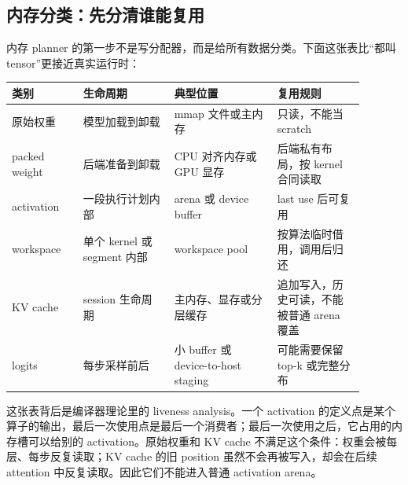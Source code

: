 \subsection{内存分类：先分清谁能复用}

内存 planner 的第一步不是写分配器，而是给所有数据分类。下面这张表比“都叫 tensor”更接近真实运行时：

\begin{center}
\begin{tabular}{p{0.18\linewidth}p{0.23\linewidth}p{0.26\linewidth}p{0.22\linewidth}}
\toprule
类别 & 生命周期 & 典型位置 & 复用规则 \\
\midrule
原始权重 & 模型加载到卸载 & mmap 文件或主内存 & 只读，不能当 scratch \\
packed weight & 后端准备到卸载 & CPU 对齐内存或 GPU 显存 & 后端私有布局，按 kernel 合同读取 \\
activation & 一段执行计划内部 & arena 或 device buffer & last use 后可复用 \\
workspace & 单个 kernel 或 segment 内部 & workspace pool & 按算法临时借用，调用后归还 \\
KV cache & session 生命周期 & 主内存、显存或分层缓存 & 追加写入，历史可读，不能被普通 arena 覆盖 \\
logits & 每步采样前后 & 小 buffer 或 device-to-host staging & 可能需要保留 top-k 或完整分布 \\
\bottomrule
\end{tabular}
\end{center}

这张表背后是编译器理论里的 liveness analysis。一个 activation 的定义点是某个算子的输出，最后一次使用点是最后一个消费者；最后一次使用之后，它占用的内存槽可以给别的 activation。原始权重和 KV cache 不满足这个条件：权重会被每层、每步反复读取；KV cache 的旧 position 虽然不会再被写入，却会在后续 attention 中反复读取。因此它们不能进入普通 activation arena。


